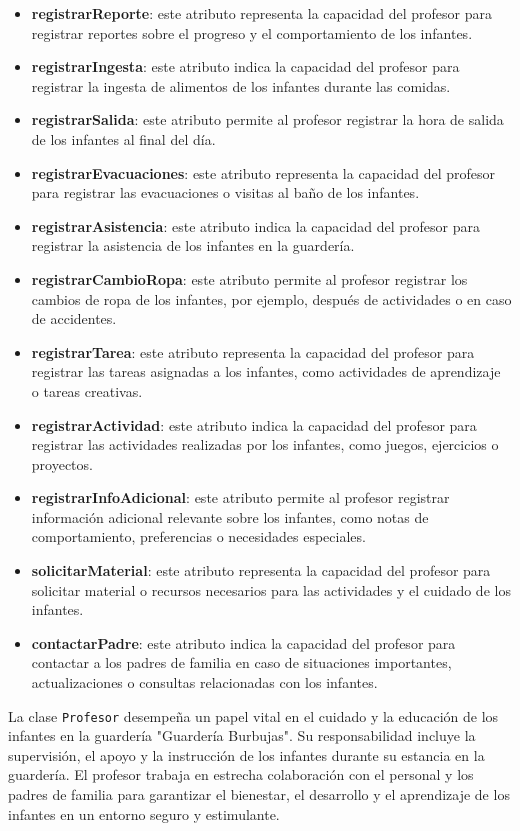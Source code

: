 \begin{itemize}
\item \textbf{registrarReporte}: este atributo representa la capacidad del profesor para registrar reportes sobre el progreso y el comportamiento de los infantes.
\item \textbf{registrarIngesta}: este atributo indica la capacidad del profesor para registrar la ingesta de alimentos de los infantes durante las comidas.
\item \textbf{registrarSalida}: este atributo permite al profesor registrar la hora de salida de los infantes al final del día.
\item \textbf{registrarEvacuaciones}: este atributo representa la capacidad del profesor para registrar las evacuaciones o visitas al baño de los infantes.
\item \textbf{registrarAsistencia}: este atributo indica la capacidad del profesor para registrar la asistencia de los infantes en la guardería.
\item \textbf{registrarCambioRopa}: este atributo permite al profesor registrar los cambios de ropa de los infantes, por ejemplo, después de actividades o en caso de accidentes.
\item \textbf{registrarTarea}: este atributo representa la capacidad del profesor para registrar las tareas asignadas a los infantes, como actividades de aprendizaje o tareas creativas.
\item \textbf{registrarActividad}: este atributo indica la capacidad del profesor para registrar las actividades realizadas por los infantes, como juegos, ejercicios o proyectos.
\item \textbf{registrarInfoAdicional}: este atributo permite al profesor registrar información adicional relevante sobre los infantes, como notas de comportamiento, preferencias o necesidades especiales.
\item \textbf{solicitarMaterial}: este atributo representa la capacidad del profesor para solicitar material o recursos necesarios para las actividades y el cuidado de los infantes.
\item \textbf{contactarPadre}: este atributo indica la capacidad del profesor para contactar a los padres de familia en caso de situaciones importantes, actualizaciones o consultas relacionadas con los infantes.
\end{itemize}

La clase \texttt{Profesor} desempeña un papel vital en el cuidado y la educación de los infantes en la guardería "Guardería Burbujas". Su responsabilidad incluye la supervisión, el apoyo y la instrucción de los infantes durante su estancia en la guardería. El profesor trabaja en estrecha colaboración con el personal y los padres de familia para garantizar el bienestar, el desarrollo y el aprendizaje de los infantes en un entorno seguro y estimulante.


